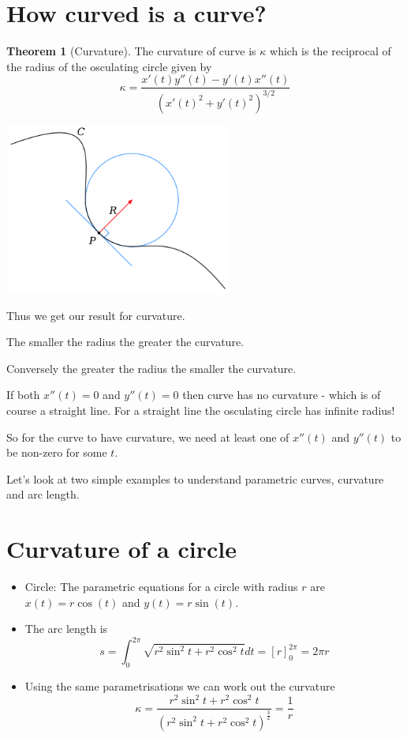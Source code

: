 \documentclass[12pt]{article} %
\theoremstyle{definition}
\theoremstyle{theorem}
\newtheorem{theorem}{Theorem}[section]
\begin{document}
\section{How curved is a curve?}
\begin{tcolorbox}
	\begin{theorem}[Curvature]
		The curvature of curve is $\kappa$ which is the reciprocal of the radius of the osculating circle given by
		\[
		\kappa=\frac{x'(t) y''(t) - y'(t) x''(t)}{\left( x'(t)^2 + y'(t)^2 \right)^{3/2}}
		\]
	\end{theorem}
	\begin{minipage}{\linewidth}
		\centering
		\includegraphics[width=75mm, scale=0.4]{Curvature_circle.png}
	\end{minipage}
\end{tcolorbox}

Thus we get our result for curvature. 

The smaller the radius the greater the curvature.

Conversely the greater the radius the smaller the curvature.

If both $x''(t)=0$ and $y''(t)=0$ then curve has no curvature - which is of course a straight line. For a straight line the osculating circle has infinite radius!

So for the curve to have curvature, we need at least one of $x''(t)$ and $y''(t)$ to be non-zero for some $t$.

Let's look at two simple examples to understand parametric curves, curvature and arc length.

\section{Curvature of a circle}
\begin{tcolorbox}
	\begin{itemize}	
	\item Circle: The parametric equations for a circle with radius $r$ are $x(t)=r \cos(t)$ and $y(t)= r \sin(t)$. 
	\item The arc length is 
	\[	
	s = \int_{0}^{2 \pi} \sqrt{r^2 \sin^2 t + r^2 \cos^2 t}dt = \left[r \right]_{0}^{2 \pi} = 2 \pi r
	\]
	\item Using the same parametrisations we can work out the curvature
	\[
	\kappa = \frac{r^2 \sin^2 t + r^2 \cos^2 t}{\left(r^2 \sin^2 t + r^2 \cos^2 t \right) ^ \frac{3}{2}} = \frac{1}{r}
	\]
	\end{itemize}
\end{tcolorbox}
\end{document}
